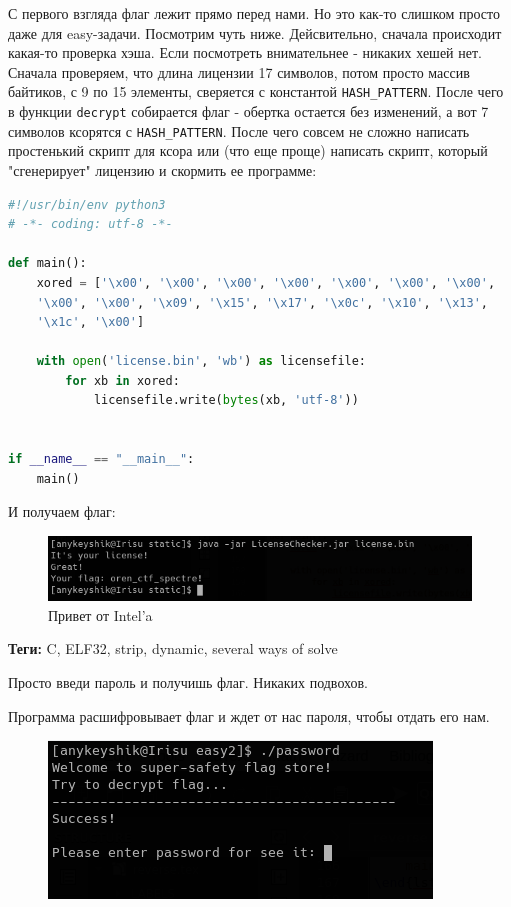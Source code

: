 \documentclass[idxtotoc,hyperref,openany,oneside]{files/reverse} %
\begin{document}
С первого взгляда флаг лежит прямо перед нами. Но это как-то слишком просто даже для easy-задачи. Посмотрим чуть ниже. Дейсвительно, сначала происходит какая-то проверка хэша. Если посмотреть внимательнее - никаких хешей нет. Сначала проверяем, что длина лицензии 17 символов, потом просто массив байтиков, с 9 по 15 элементы, сверяется с константой \verb|HASH_PATTERN|. После чего в функции \verb|decrypt| собирается флаг - обертка остается без изменений, а вот 7 символов ксорятся с \verb|HASH_PATTERN|. После чего совсем не сложно написать простенький скрипт для ксора или (что еще проще) написать скрипт, который "сгенерирует" лицензию и скормить ее программе:
\begin{lstlisting}[language=Python, caption=Генератор лицензии]
#!/usr/bin/env python3
# -*- coding: utf-8 -*-

def main():
    xored = ['\x00', '\x00', '\x00', '\x00', '\x00', '\x00', '\x00',
    '\x00', '\x00', '\x09', '\x15', '\x17', '\x0c', '\x10', '\x13', 
    '\x1c', '\x00']

    with open('license.bin', 'wb') as licensefile:
        for xb in xored:
            licensefile.write(bytes(xb, 'utf-8'))


if __name__ == "__main__":
    main()
\end{lstlisting}

И получаем флаг:
\begin{figure}[H]
\begin{center}
\includegraphics[width=0.7\linewidth]{files/java-flag}
\end{center}
\caption{Привет от Intel'a}
\label{fig:java-flag}
\end{figure}



\textbf{Теги:} C, ELF32, strip, dynamic, several ways of solve\vspace{\baselineskip}

\begin{tcolorbox}
Просто введи пароль и получишь флаг. Никаких подвохов.
\end{tcolorbox}

Программа расшифровывает флаг и ждет от нас пароля, чтобы отдать его нам.
\begin{figure}[H]
\begin{center}
\includegraphics[width=0.5\linewidth]{files/enigma-hello}
\end{center}
\label{fig:enigma-hello}
\end{figure}
\end{document}
